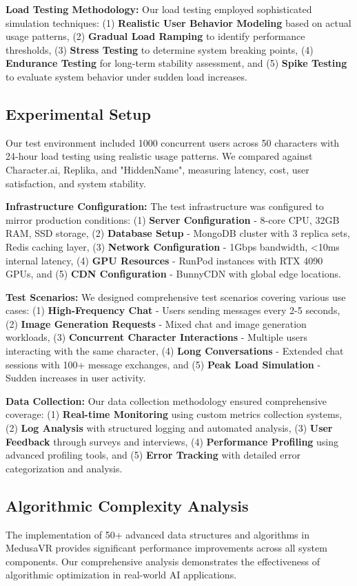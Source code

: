 \documentclass[conference]{IEEEtran}
\begin{document}
\textbf{Load Testing Methodology:} Our load testing employed sophisticated simulation techniques: (1) \textbf{Realistic User Behavior Modeling} based on actual usage patterns, (2) \textbf{Gradual Load Ramping} to identify performance thresholds, (3) \textbf{Stress Testing} to determine system breaking points, (4) \textbf{Endurance Testing} for long-term stability assessment, and (5) \textbf{Spike Testing} to evaluate system behavior under sudden load increases.

\subsection{Experimental Setup}
Our test environment included 1000 concurrent users across 50 characters with 24-hour load testing using realistic usage patterns. We compared against Character.ai, Replika, and "HiddenName", measuring latency, cost, user satisfaction, and system stability.

\textbf{Infrastructure Configuration:} The test infrastructure was configured to mirror production conditions: (1) \textbf{Server Configuration} - 8-core CPU, 32GB RAM, SSD storage, (2) \textbf{Database Setup} - MongoDB cluster with 3 replica sets, Redis caching layer, (3) \textbf{Network Configuration} - 1Gbps bandwidth, <10ms internal latency, (4) \textbf{GPU Resources} - RunPod instances with RTX 4090 GPUs, and (5) \textbf{CDN Configuration} - BunnyCDN with global edge locations.

\textbf{Test Scenarios:} We designed comprehensive test scenarios covering various use cases: (1) \textbf{High-Frequency Chat} - Users sending messages every 2-5 seconds, (2) \textbf{Image Generation Requests} - Mixed chat and image generation workloads, (3) \textbf{Concurrent Character Interactions} - Multiple users interacting with the same character, (4) \textbf{Long Conversations} - Extended chat sessions with 100+ message exchanges, and (5) \textbf{Peak Load Simulation} - Sudden increases in user activity.

\textbf{Data Collection:} Our data collection methodology ensured comprehensive coverage: (1) \textbf{Real-time Monitoring} using custom metrics collection systems, (2) \textbf{Log Analysis} with structured logging and automated analysis, (3) \textbf{User Feedback} through surveys and interviews, (4) \textbf{Performance Profiling} using advanced profiling tools, and (5) \textbf{Error Tracking} with detailed error categorization and analysis.

\subsection{Algorithmic Complexity Analysis}
The implementation of 50+ advanced data structures and algorithms in MedusaVR provides significant performance improvements across all system components. Our comprehensive analysis demonstrates the effectiveness of algorithmic optimization in real-world AI applications.
\end{document}
